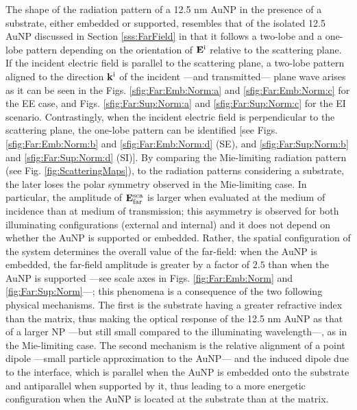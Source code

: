 The shape of the radiation pattern of a 12.5 nm AuNP in the presence of a substrate, either embedded or supported, resembles that of the isolated 12.5 AuNP discussed in Section \ref{sss:FarField} in that it follows a two-lobe and a one-lobe pattern depending on the orientation of $\vb{E}^\text{i}$ relative to the scattering plane. If the incident electric field is parallel to the scattering plane, a two-lobe pattern aligned to the direction $\vb{k}^\text{i}$ of the incident ---and transmitted--- plane wave arises as it can be seen in the Figs. \ref{sfig:Far:Emb:Norm:a} and  \ref{sfig:Far:Emb:Norm:c} for the EE case, and Figs.  \ref{sfig:Far:Sup:Norm:a} and \ref{sfig:Far:Sup:Norm:c} for the EI scenario. Contrastingly, when the incident electric field is perpendicular to the scattering plane, the one-lobe pattern can be identified [see Figs. \ref{sfig:Far:Emb:Norm:b} and \ref{sfig:Far:Emb:Norm:d} (SE), and \ref{sfig:Far:Sup:Norm:b} and \ref{sfig:Far:Sup:Norm:d} (SI)]. By comparing the Mie-limiting radiation pattern (see Fig. \ref{fig:ScatteringMaps}), to the radiation patterns considering a substrate, the later loses the polar symmetry observed in the Mie-limiting case.  In particular, the amplitude of $\vb{E}^\text{sca}_\text{far}$ is larger when evaluated at the medium of incidence  than at medium of transmission; this asymmetry is observed for both illuminating configurations (external and internal) and it does not depend on whether the AuNP is supported or embedded. Rather, the spatial configuration of the system determines the overall value of the far-field: when the AuNP is embedded, the far-field amplitude is greater by a factor of $2.5$  than when the AuNP is supported ---see scale axes in Figs. \ref{fig:Far:Emb:Norm} and \ref{fig:Far:Sup:Norm}---; this phenomena  is a consequence of the two following physical mechanisms. The first is the substrate having a greater refractive index than the matrix, thus making the optical response of the 12.5 nm AuNP as that of a larger NP ---but still small compared to the illuminating wavelength---, as in the Mie-limiting case. The second mechanism is the relative alignment of a point dipole ---small particle approximation to the AuNP--- and the induced dipole due to the interface, which is parallel when the AuNP is embedded onto the substrate and antiparallel when supported by it, thus leading to a more energetic configuration when the AuNP is located at the substrate than at the matrix.


